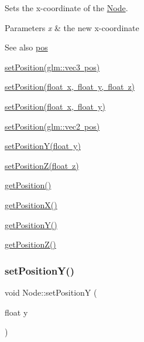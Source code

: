 Sets the x-\/coordinate of the \mbox{\hyperlink{classsage_1_1Node}{Node}}. 


\begin{DoxyParams}{Parameters}
{\em x} & the new x-\/coordinate \\
\hline
\end{DoxyParams}
\begin{DoxySeeAlso}{See also}
\mbox{\hyperlink{classsage_1_1Node_a26c32e5ec11e0ed7f33053ecac6830d5}{pos}} 

\mbox{\hyperlink{classsage_1_1Node_a12f5d88d221aa5db70c2bd53f6dc049a}{set\+Position(glm\+::vec3 pos)}} 

\mbox{\hyperlink{classsage_1_1Node_ad9899110e543c6b16997512e47c142c9}{set\+Position(float x, float y, float z)}} 

\mbox{\hyperlink{classsage_1_1Node_aaa8545c103ef1b35e5076dbedab93af5}{set\+Position(float x, float y)}} 

\mbox{\hyperlink{classsage_1_1Node_ae2731cefe38e706c2bf21afae6da18b3}{set\+Position(glm\+::vec2 pos)}} 

\mbox{\hyperlink{classsage_1_1Node_a5c97d36655f0daa71a5f6c715d2b0470}{set\+Position\+Y(float y)}} 

\mbox{\hyperlink{classsage_1_1Node_a0dd2e816d50418b9b63a78fdf166ba53}{set\+Position\+Z(float z)}} 

\mbox{\hyperlink{classsage_1_1Node_a11fbdf2a2dcdf8bdc014df65f3003925}{get\+Position()}} 

\mbox{\hyperlink{classsage_1_1Node_a17e92da5beaeb4b299c4e93729a22b1a}{get\+Position\+X()}} 

\mbox{\hyperlink{classsage_1_1Node_a26337a40b7da400233451b71e85759cc}{get\+Position\+Y()}} 

\mbox{\hyperlink{classsage_1_1Node_a0c6023aabdeeff9cf981ad81e6aaed9c}{get\+Position\+Z()}} 
\end{DoxySeeAlso}
\mbox{\label{classsage_1_1Node_a5c97d36655f0daa71a5f6c715d2b0470}} 
\subsubsection{\texorpdfstring{setPositionY()}{setPositionY()}}
{\footnotesize\ttfamily void Node\+::set\+PositionY (\begin{DoxyParamCaption}\item[{float}]{y }\end{DoxyParamCaption})}



